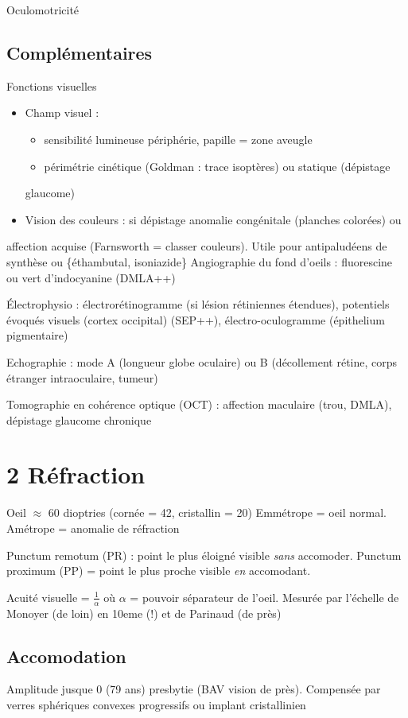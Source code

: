 \documentclass[11pt]{article}
\begin{document}
Oculomotricité

\subsection{Complémentaires}
\label{sec:org0f56592}
Fonctions visuelles
\begin{itemize}
\item Champ visuel :
\begin{itemize}
\item sensibilité lumineuse \dec périphérie, papille = zone aveugle
\item périmétrie cinétique (Goldman : trace isoptères) ou statique (dépistage
\end{itemize}
glaucome)
\item Vision des couleurs : si dépistage anomalie congénitale (planches colorées) ou
\end{itemize}
affection acquise (Farnsworth = classer couleurs). Utile pour antipaludéens de
synthèse ou \{éthambutal, isoniazide\}
Angiographie du fond d'oeils : fluorescine ou vert d'indocyanine (DMLA++)

Électrophysio : électrorétinogramme (si lésion rétiniennes étendues), potentiels
évoqués visuels (cortex occipital) (SEP++), électro-oculogramme (épithelium pigmentaire)

Echographie : mode A (longueur globe oculaire) ou B (décollement rétine, corps
étranger intraoculaire, tumeur)

Tomographie en cohérence optique (OCT) : affection maculaire (trou, DMLA),
dépistage glaucome chronique

\section{2 Réfraction}
\label{sec:orgd15c0df}
Oeil \(\approx\) 60 dioptries (cornée = 42, cristallin = 20)
Emmétrope = oeil normal. Amétrope = anomalie de réfraction

Punctum remotum (PR) : point le plus éloigné visible \emph{sans} accomoder. Punctum
proximum (PP) = point le plus proche visible \emph{en} accomodant.

Acuité visuelle = \(\frac{1}{\alpha}\) où \(\alpha\) = pouvoir séparateur de
l'oeil. Mesurée par l'échelle de Monoyer (de loin) en 10eme (!) et de Parinaud
(de près)

\subsection{Accomodation}
\label{sec:orgc445e66}
Amplitude \dec jusque 0 (79 ans) \thus presbytie (BAV vision de près). Compensée
par verres sphériques convexes progressifs ou implant cristallinien
\end{document}
